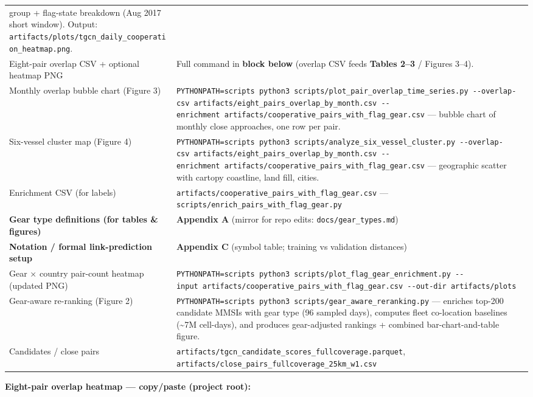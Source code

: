 \documentclass[
]{article}
\begin{document}
{\begin{longtable}[]{@{}
  >{\raggedright\arraybackslash}p{}
  >{\raggedright\arraybackslash}p{}@{}}
group + flag-state breakdown (Aug 2017 short window). Output:
\texttt{artifacts/plots/tgcn\_daily\_cooperation\_heatmap.png}. \\
Eight-pair overlap CSV + optional heatmap PNG & Full command in
\textbf{block below} (overlap CSV feeds \textbf{Tables 2--3} / Figures
3--4). \\
Monthly overlap bubble chart (Figure 3) &
\texttt{PYTHONPATH=scripts\ python3\ scripts/plot\_pair\_overlap\_time\_series.py\ -\/-overlap-csv\ artifacts/eight\_pairs\_overlap\_by\_month.csv\ -\/-enrichment\ artifacts/cooperative\_pairs\_with\_flag\_gear.csv}
--- bubble chart of monthly close approaches, one row per pair. \\
Six-vessel cluster map (Figure 4) &
\texttt{PYTHONPATH=scripts\ python3\ scripts/analyze\_six\_vessel\_cluster.py\ -\/-overlap-csv\ artifacts/eight\_pairs\_overlap\_by\_month.csv\ -\/-enrichment\ artifacts/cooperative\_pairs\_with\_flag\_gear.csv}
--- geographic scatter with cartopy coastline, land fill, cities. \\
Enrichment CSV (for labels) &
\texttt{artifacts/cooperative\_pairs\_with\_flag\_gear.csv} ---
\texttt{scripts/enrich\_pairs\_with\_flag\_gear.py} \\
\textbf{Gear type definitions (for tables \& figures)} &
\textbf{Appendix A} (mirror for repo edits:
\texttt{docs/gear\_types.md}) \\
\textbf{Notation / formal link-prediction setup} & \textbf{Appendix C}
(symbol table; training vs validation distances) \\
Gear × country pair-count heatmap (updated PNG) &
\texttt{PYTHONPATH=scripts\ python3\ scripts/plot\_flag\_gear\_enrichment.py\ -\/-input\ artifacts/cooperative\_pairs\_with\_flag\_gear.csv\ -\/-out-dir\ artifacts/plots} \\
Gear-aware re-ranking (Figure 2) &
\texttt{PYTHONPATH=scripts\ python3\ scripts/gear\_aware\_reranking.py}
--- enriches top-200 candidate MMSIs with gear type (96 sampled days),
computes fleet co-location baselines (\textasciitilde7M cell-days), and
produces gear-adjusted rankings + combined bar-chart-and-table
figure. \\
Candidates / close pairs &
\texttt{artifacts/tgcn\_candidate\_scores\_fullcoverage.parquet},
\texttt{artifacts/close\_pairs\_fullcoverage\_25km\_w1.csv} \\
\end{longtable}
}

\textbf{Eight-pair overlap heatmap --- copy/paste (project root):}
\end{document}
